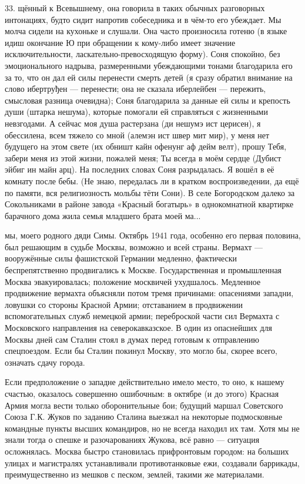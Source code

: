\label{33-1}
33. щённый к Всевышнему, она говорила в таких обычных разговорных интонациях, будто сидит напротив собеседника и в чём-то его убеждает. Мы молча сидели на кухоньке и слушали. Она часто произносила готеню (в языке идиш окончание Ю при обращении к кому-либо имеет значение исключительности, ласкательно-превосходящую форму). Соня спокойно, без эмоционального надрыва, размеренными убеждающими тонами благодарила его за то, что он дал ей силы перенести смерть детей (я сразу обратил внимание на слово ибертруђен — перенести; она не сказала иберлейбен — пережить, смысловая разница очевидна); Соня благодарила за данные ей силы и крепость души (штарка нешума), которые помогали ей справляться с жизненными невзгодами. А сейчас моя душа растерзана (ди нешумэ ист церисен), я обессилена, всем тяжело со мной (алемэн ист швер мит мир), у меня нет будущего на этом свете (их обништ кайн офенунг аф дейм велт), прошу Тебя, забери меня из этой жизни, пожалей меня; Ты всегда в моём сердце (Дубист эйбиг ин майн арц). На последних словах Соня разрыдалась. Я вошёл в её комнату после бебы. (Не знаю, передалась ли в кратком воспроизведении, да ещё по памяти, вся религиозность мольбы тёти Сони). В селе Богородском далеко за Сокольниками в районе завода «Красный богатырь» в однокомнатной квартирке барачного дома жила семья младшего брата моей ма...

\label{34-1}
мы, моего родного дяди Симы. Октябрь 1941 года, особенно его первая половина, был решающим в судьбе Москвы, возможно и всей страны. Вермахт — вооружённые силы фашистской Германии медленно, фактически беспрепятственно продвигались к Москве. Государственная и промышленная Москва эвакуировалась; положение москвичей ухудшалось. Медленное продвижение вермахта объясняли потом тремя причинами: опасениями западни, ловушки со стороны Красной Армии; отставанием в продвижении вспомогательных служб немецкой армии; переброской части сил Вермахта с Московского направления на северокавказское. В один из опаснейших для Москвы дней сам Сталин стоял в думах перед готовым к отправлению спецпоездом. Если бы Сталин покинул Москву, это могло бы, скорее всего, означать сдачу города.

\label{34-2}
Если предположение о западне действительно имело место, то оно, к нашему счастью, оказалось совершенно ошибочным: в октябре (и до этого) Красная Армия могла вести только оборонительные бои; будущий маршал Советского Союза Г.К. Жуков по заданию Сталина выезжал на некоторые подмосковные командные пункты высших командиров, но не всегда находил их там. Хотя мы не знали тогда о спешке и разочарованиях Жукова, всё равно — ситуация осложнялась. Москва быстро становилась прифронтовым городом: на больших улицах и магистралях устанавливали противотанковые ежи, создавали баррикады, преимущественно из мешков с песком, землей, такими же материалами.

